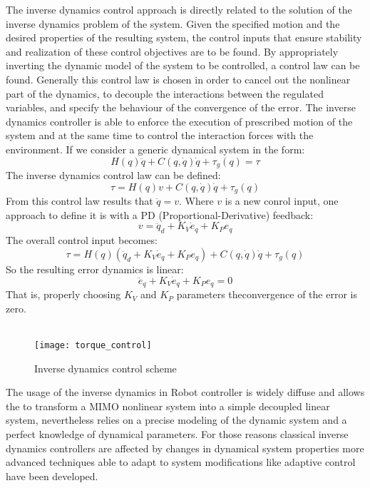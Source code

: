 The inverse dynamics control approach is directly related to the solution of the inverse dynamics problem of the system. Given the specified motion and the desired properties of the resulting system, the control inputs that ensure stability and realization of these control objectives are to be found. By appropriately inverting the dynamic model of the system to be controlled, a control law can be found. Generally this control law is chosen in order to cancel out the nonlinear part of the dynamics, to decouple the interactions between the regulated variables, and specify the behaviour of the convergence of the error. The inverse dynamics controller is able to enforce the execution of prescribed motion of the system and at the same time to control the interaction forces with the environment. If we consider a generic dynamical system in the form:
\begin{equation}
	H(q)\ddot{q}+C(q,\dot{q})\dot{q}+\tau_g(q)=\tau	
\end{equation}
The inverse dynamics control law can be defined: 
\begin{equation}
	\tau=H(q)v+C(q,\dot{q})\dot{q}+\tau_g(q)
\end{equation}
From this control law results that $\ddot{q}=v$. Where $v$ is a new conrol input, one approach to define it is with a PD (Proportional-Derivative) feedback:
\begin{equation}
	v = \ddot{q}_d+K_V\dot{e}_q+K_Pe_q
\end{equation}
The overall control input becomes:
\begin{equation}
	\tau=H(q)(\ddot{q}_d+K_V\dot{e}_q+K_Pe_q)+C(q,\dot{q})\dot{q}+\tau_g(q)
	\label{inverse_dyn_cont_law}
\end{equation}
So the resulting error dynamics is linear:
\begin{equation}
	\ddot{e}_q+K_V\dot{e}_q+K_Pe_q=0
\end{equation}
That is, properly choosing $K_V$ and $K_P$ parameters theconvergence of the error is zero.  
\\\
\begin{figure}
	\centering
	\texttt{[image: torque\_control]}
	\label{Torque_control_scheme}
	\caption{Inverse dynamics control scheme}
\end{figure}
The usage of the inverse dynamics in Robot controller is widely diffuse and allows the to transform a MIMO nonlinear system into a simple decoupled linear system, nevertheless relies on a precise modeling of the dynamic system and a perfect knowledge of dynamical parameters. For those reasons classical inverse dynamics controllers are affected by changes in dynamical system properties more advanced techniques able to adapt to system modifications like adaptive control have been developed.  
